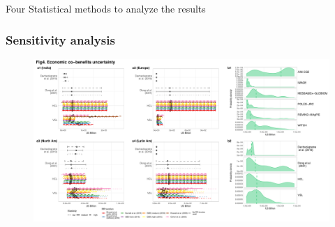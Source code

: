 \begin{frame}
\begin{center}
\Huge Four \textcolor{mygreen}{Statistical methods} to analyze the results
\end{center}
\end{frame}

\begin{frame}
    \frametitle{Sensitivity analysis}
    \begin{figure}[htb!]
        \centering
        \includegraphics[width = \linewidth]{Images_statistical_meth/econ_uncertainty_2030.pdf}
    \end{figure}    
    \vfill \hfill \cite{rodes-bachs_beyond_ap}
\end{frame}



